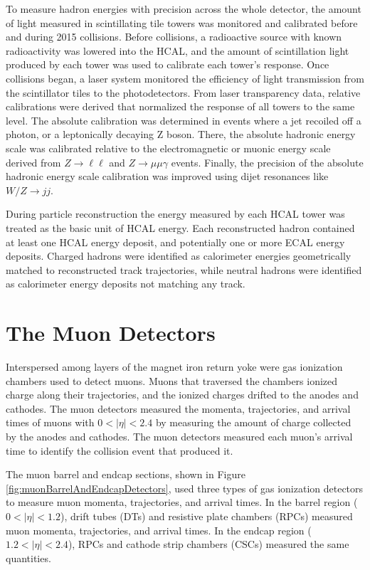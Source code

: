 To measure hadron energies with precision across the whole detector, the amount of light measured in scintillating tile towers 
was monitored and calibrated before and during 2015 collisions.  Before collisions, a radioactive source 
with known radioactivity was lowered into the HCAL, and the amount of scintillation light produced by each 
tower was used to calibrate each tower's response.  Once collisions began, a laser system 
monitored the efficiency of light transmission from the scintillator tiles to the photodetectors.  
From laser transparency data, relative calibrations were derived that normalized the response of all towers 
to the same level.  The absolute 
calibration was determined in events where a jet recoiled off a photon, or a leptonically decaying Z boson.  
There, the absolute hadronic energy 
scale was calibrated relative to the electromagnetic or muonic energy scale derived from $Z \rightarrow \ell\ell$ 
and $Z \rightarrow \mu\mu\gamma$ events.  Finally, the precision of the absolute hadronic energy scale calibration 
was improved using dijet resonances like $W/Z \rightarrow jj$.

During particle reconstruction the energy measured by each HCAL tower was treated as the basic unit of HCAL energy.  
Each reconstructed hadron contained at least one HCAL energy deposit, and potentially one or more ECAL energy 
deposits.  Charged hadrons were identified as calorimeter energies geometrically matched to reconstructed 
track trajectories, while neutral hadrons were identified as calorimeter energy deposits not matching any 
track.


\section{The Muon Detectors}
\label{sec:muonDetectorsDescription}
Interspersed among layers of the magnet iron return yoke were gas ionization chambers used to detect muons.  Muons 
that traversed the chambers ionized charge along their trajectories, and the ionized charges drifted to the 
anodes and cathodes.  The muon detectors measured the momenta, trajectories, and arrival times of muons with $0 < |\eta| < 2.4$ by 
measuring the amount of charge collected by the anodes and cathodes.  The muon detectors measured each muon's arrival 
time to identify the collision event that produced it.

The muon barrel and endcap sections, shown in Figure \ref{fig:muonBarrelAndEndcapDetectors}, used three types of 
gas ionization detectors to measure muon momenta, trajectories, and arrival times.  In the barrel region ($0 < |\eta| < 1.2$), 
drift tubes (DTs) and resistive plate chambers (RPCs) measured muon momenta, trajectories, and arrival times.  In 
the endcap region ($1.2 < |\eta| < 2.4$), RPCs and cathode strip chambers (CSCs) measured the same quantities.

